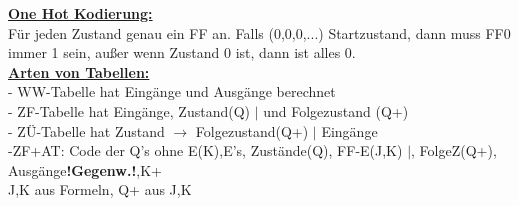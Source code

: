 \documentclass[8pt]{extarticle}
\begin{document}
\begin{minipage}{0.33\textwidth}
\underline{\textbf{One Hot Kodierung:}}\\
Für jeden Zustand genau ein FF an. Falls (0,0,0,...) Startzustand, dann muss FF0 immer 1 sein, außer wenn Zustand 0 ist, dann ist alles 0. \\

\underline{\textbf{Arten von Tabellen:}}\\
- WW-Tabelle hat Eingänge und Ausgänge berechnet\\
- ZF-Tabelle hat Eingänge, Zustand(Q) $|$ und Folgezustand (Q+)\\
- ZÜ-Tabelle hat Zustand $\rightarrow$ Folgezustand(Q+) $|$ Eingänge\\
-ZF+AT: Code der Q's ohne E(K),E's, Zustände(Q), FF-E(J,K) $|$, FolgeZ(Q+), Ausgänge\textbf{!Gegenw.!},K+\\
\phantom{ss} J,K aus Formeln, Q+ aus J,K
\end{minipage}
\end{document}

